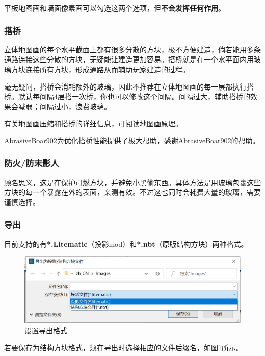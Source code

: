 \documentclass[UTF8]{ctexart}
\begin{document}
    平板地图画和墙面像素画可以勾选这两个选项，但\textbf{不会发挥任何作用}。

    \subsubsection{搭桥}
    立体地图画的每个水平截面上都有很多分散的方块，极不方便建造，倘若能用多条通路连接这些分散的方块，无疑能让建造更加容易。搭桥就是在一个水平面内用玻璃方块连接所有方块，形成通路从而辅助玩家建造的过程。
    
    毫无疑问，搭桥会消耗额外的玻璃，因此不推荐在立体地图画的每一层都执行搭桥。默认每间隔4层搭一次桥，你也可以修改这个间隔。间隔过大，辅助搭桥的效果会减弱；间隔过小，浪费玻璃。
    
    有关地图画压缩和搭桥的详细信息，可阅读\href{https://github.com/ToKiNoBug/SlopeCraftTutorial/blob/main/BasicPrinciple/Principle%20of%20map%20pixel%20arts.md}{地图画原理}。

    \href{https://github.com/AbrasiveBoar902}{AbrasiveBoar902}为优化搭桥性能提供了极大帮助，感谢AbrasiveBoar902的帮助。

    \subsubsection{防火/防末影人}
    顾名思义，这是在保护可燃方块，并避免小黑偷东西。具体方法是用玻璃包裹这些方块的每一个暴露在外的表面，亲测有效。不过这也同时会耗费大量的玻璃，需要谨慎选择。

    \subsubsection{导出}
    目前支持的有\textbf{*.Litematic}（投影mod）和\textbf{*.nbt}（原版结构方块）两种格式。

    \begin{figure}[htbp]
        \centering
        \includegraphics[width=15cm]{Img7_SelectFormat.png}
        \caption{设置导出格式}
        \label{setExport3DFormat}
    \end{figure}

    若要保存为结构方块格式，须在导出时选择相应的文件后缀名，如图\ref*{setExport3DFormat}所示。
\end{document}
